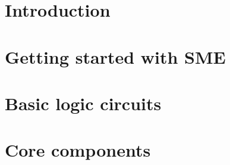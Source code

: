 \documentclass[a4paper]{article}
\begin{document}
\maketitle



\newpage
\tableofcontents
\newpage

\section{Introduction}


\newpage
\section{Getting started with SME}


\newpage
\section{Basic logic circuits}
\label{sec:logic-circuits}


\newpage
\section{Core components}

\end{document}
